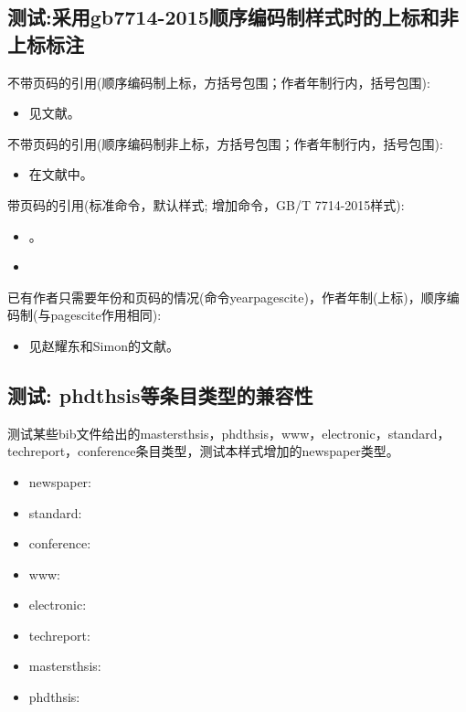 \subsection{测试:采用gb7714-2015顺序编码制样式时的上标和非上标标注}\label{sec:cite:cmd:test}
\begin{refsection}
不带页码的引用(顺序编码制上标，方括号包围；作者年制行内，括号包围):
\begin{itemize}
  \item 见文献\cite{Peebles2001-100-100}。
\end{itemize}

不带页码的引用(顺序编码制非上标，方括号包围；作者年制行内，括号包围):
\begin{itemize}
  \item 在文献\parencite{Miroslav2004--}中。
\end{itemize}

带页码的引用(标准命令，默认样式; 增加命令，GB/T 7714-2015样式):
\begin{itemize}
  \item \cite[见][49页]{蔡敏2006--}\parencite[见][49页]{Miroslav2004--}。
  \item {}
\end{itemize}

已有作者只需要年份和页码的情况(命令yearpagescite)，作者年制(上标)，顺序编码制(与pagescite作用相同):
\begin{itemize}
  \item 见赵耀东和Simon的文献。
\end{itemize}

\printbibliography[heading=bibliography,title=【gb7714-2015顺序编码制上标和非上标标注测试】]
\end{refsection}

\subsection{测试: phdthsis等条目类型的兼容性}\label{sec:entrytype:compatibility}
\begin{refsection}
测试某些bib文件给出的mastersthsis，phdthsis，www，electronic，standard，techreport，conference条目类型，测试本样式增加的newspaper类型。
\begin{itemize}
  \item newspaper:\cite{张田勤2000--}
  \item standard:\cite{全国文献工作标准化委员会第七分委员会1986--,国家标准局信息分类编码研究所1988-59-92}
  \item conference:\cite{Li2004-21-24}
  \item www:\cite{萧钰2001--}
  \item electronic:\cite{OMG2003--}
  \item techreport:\cite{Humphrey1971--}
  \item mastersthsis:\cite{张志祥1998--}
  \item phdthsis:\cite{张若凌2004--}
\end{itemize}

\printbibliography[heading=bibliography,title=【兼容phdthsis等条目类型】]
\end{refsection}

